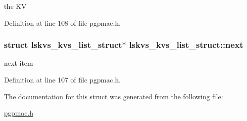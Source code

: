 the K\-V 



Definition at line 108 of file pgpmac.\-h.

\hypertarget{structlskvs__kvs__list__struct_aa3ed4d35bdda99bb1c08793633579edc}{
\subsubsection[{next}]{\setlength{\rightskip}{0pt plus 5cm}struct {\bf lskvs\-\_\-kvs\-\_\-list\-\_\-struct}$\ast$ lskvs\-\_\-kvs\-\_\-list\-\_\-struct\-::next}}\label{structlskvs__kvs__list__struct_aa3ed4d35bdda99bb1c08793633579edc}


next item 



Definition at line 107 of file pgpmac.\-h.



The documentation for this struct was generated from the following file\-:\begin{DoxyCompactItemize}
\item 
\hyperlink{pgpmac_8h}{pgpmac.\-h}\end{DoxyCompactItemize}
